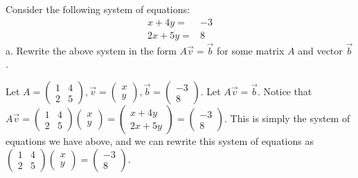 \documentclass[12pt]{article}
\newenvironment{problem}[2][Problem]
{
	\begin{trivlist} 
		\item[\hskip \labelsep {\bfseries #1 #2:}]
	}
{
	\end{trivlist}
	}
\newenvironment{solution}[1][Solution]
{
	\begin{trivlist} 
		\item[\hskip \labelsep {\itshape #1:}]
	}
	{
	\end{trivlist}
}
\begin{document}
\begin{problem}{3}
\begin{solution}
\end{solution}
\end{problem}






\newpage
\begin{problem}{4}
Consider the following system of equations:
\begin{align*}
x+4y=& -3\\
2x+5y=&8
\end{align*}
\noindent
\newline
\newline
a. Rewrite the above system in the form $A\vec{v}=\vec{b}$ for some matrix $A$ and vector $\vec{b}$.
\begin{solution}
Let $A = \begin{pmatrix} 1 &4\\2&5 \end{pmatrix}, \vec{v} = \begin{pmatrix} x\\y \end{pmatrix},\vec{b}=\begin{pmatrix}-3\\8\end{pmatrix}$. Let $A\vec{v}=\vec{b}$.
Notice that $A\vec{v}=\begin{pmatrix} 1 &4\\2&5 \end{pmatrix} \begin{pmatrix} x\\y \end{pmatrix}= \begin{pmatrix} x+4y\\2x+5y \end{pmatrix} = \begin{pmatrix}-3\\8\end{pmatrix}$. This is simply the system of equations we have above, and we can rewrite this system of equations as $\begin{pmatrix} 1 &4\\2&5 \end{pmatrix} \begin{pmatrix} x\\y \end{pmatrix}=\begin{pmatrix}-3\\8\end{pmatrix}$.

\end{solution}
\end{problem}
\end{document}
